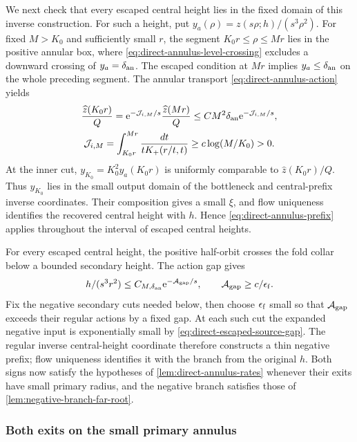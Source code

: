 We next check that every escaped central height lies in the fixed
domain of this inverse construction. For such a height, put
\(y_a(\rho)=z(s\rho;h)/(s^3\rho^2)\).
For fixed \(M>K_0\) and sufficiently small \(r\),
the segment \(K_0r\le\rho\le Mr\) lies in the
positive annular box, where \eqref{eq:direct-annulus-level-crossing}
excludes a downward crossing of \(y_a=\delta_{\rm an}\).
The escaped condition at \(Mr\) implies
\(y_a\le\delta_{\rm an}\) on the whole preceding segment.
The annular transport \eqref{eq:direct-annulus-action} yields
\[
 \begin{gathered}
 \frac{\widehat z(K_0r)}{Q}
   =\mathrm e^{-\mathcal J_{i,M}/s}\frac{\widehat z(Mr)}{Q}
   \le CM^2\delta_{\rm an}\mathrm e^{-\mathcal J_{i,M}/s},\\
 \mathcal J_{i,M}=\int_{K_0r}^{Mr}
       \frac{dt}{tK_+(r/t,t)}
       \ge c\log(M/K_0)>0.
 \end{gathered}
\]
At the inner cut, \(y_{K_0}=K_0^2y_a(K_0r)\) is
uniformly comparable to \(\widehat z(K_0r)/Q\).
Thus \(y_{K_0}\) lies in the small output domain of the bottleneck
and central-prefix inverse coordinates. Their composition gives a
small \(\xi\), and flow uniqueness identifies the recovered central
height with \(h\). Hence
\eqref{eq:direct-annulus-prefix} applies throughout the interval of
escaped central heights.

For every escaped central height, the positive half-orbit crosses
the fold collar below a bounded secondary height. The action gap gives
\begin{equation}
\label{eq:direct-escaped-source-gap}
 h/(s^3r^2)\le C_{M,\delta_{\rm an}}\mathrm e^{-\mathcal A_{\rm gap}/s},\qquad
 \mathcal A_{\rm gap}\ge c/\epsilon_{\rm f}.
\end{equation}
Fix the negative secondary cuts needed below, then choose
\(\epsilon_{\rm f}\) small so that \(\mathcal A_{\rm gap}\) exceeds their
regular actions by a fixed gap.
At each such cut the expanded negative input is exponentially small
by \eqref{eq:direct-escaped-source-gap}. The regular inverse
central-height coordinate therefore constructs a thin negative prefix;
flow uniqueness identifies it with the branch from the original \(h\).
Both signs now satisfy the hypotheses of
\cref{lem:direct-annulus-rates} whenever their exits
have small primary radius, and the negative branch satisfies those of
\cref{lem:negative-branch-far-root}.

\subsubsection{Both exits on the small primary annulus}

